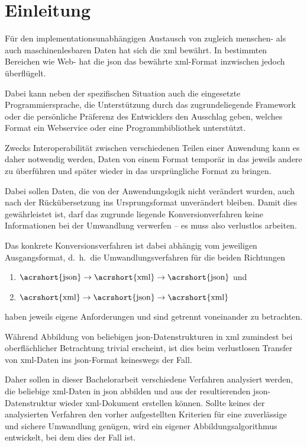 \chapter{Einleitung} \label{chap:intro}

Für den implementationsunabhängigen Austausch von zugleich menschen- als auch
maschinenlesbaren Daten hat sich die \gls{xml}
bewährt. In bestimmten Bereichen wie Web- hat die \gls{json}
das bewährte \acrshort{xml}-Format inzwischen jedoch überflügelt.

Dabei kann neben der spezifischen Situation auch die eingesetzte
Programmiersprache, die Unterstützung durch das zugrundeliegende Framework
oder die persönliche Präferenz des Entwicklers den Ausschlag geben, welches
Format ein Webservice oder eine Programmbibliothek unterstützt.

Zwecks Interoperabilität zwischen verschiedenen Teilen einer Anwendung kann es
daher notwendig werden, Daten von einem Format temporär in das jeweils andere
zu überführen und später wieder in das ursprüngliche Format zu bringen.

Dabei sollen Daten, die von der Anwendungslogik nicht verändert wurden, auch
nach der Rückübersetzung ins Ursprungsformat unverändert bleiben. Damit dies
gewährleistet ist, darf das zugrunde liegende Konversionverfahren keine
Informationen bei der Umwandlung verwerfen -- es muss also verlustlos %
arbeiten.

Das konkrete Konversionsverfahren ist dabei abhängig vom jeweiligen
Ausgangsformat, d.~h.\ die Umwandlungsverfahren für die beiden Richtungen
\begin{enumerate}
    \item $\text{\acrshort{json}} \rightarrow \text{\acrshort{xml}} \rightarrow \text{\acrshort{json}}$ und
    \item $\text{\acrshort{xml}} \rightarrow \text{\acrshort{json}} \rightarrow \text{\acrshort{xml}}$
\end{enumerate}
haben jeweils eigene Anforderungen und sind getrennt voneinander zu betrachten.

Während Abbildung von beliebigen \acrshort{json}-Datenstrukturen in \acrshort{xml} zumindest bei
oberflächlicher Betrachtung trivial erscheint, ist dies beim verlustlosen
Transfer von \acrshort{xml}-Daten ins \acrshort{json}-Format keineswegs der Fall.

Daher sollen in dieser Bachelorarbeit verschiedene Verfahren analysiert
werden, die beliebige \acrshort{xml}-Daten in \acrshort{json} abbilden und aus der resultierenden
\acrshort{json}-Datenstruktur wieder \acrshort{xml}-Dokument erstellen können. Sollte keines
der analysierten Verfahren den vorher aufgestellten Kriterien für eine
zuverlässige und sichere Umwandlung genügen, wird ein eigener
Abbildungsalgorithmus entwickelt, bei dem dies der Fall ist.

